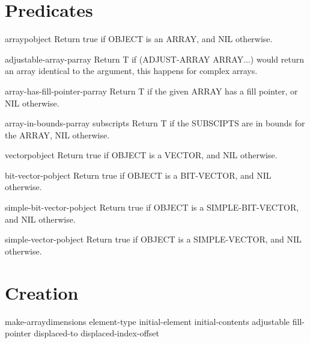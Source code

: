 \documentclass[10pt,english]{book}
\begin{document}
\section{Predicates}
\label{sec:array-predicates}

\begin{function}{arrayp}{object}
  Return true if OBJECT is an ARRAY, and NIL otherwise.
\end{function}

\begin{function}{adjustable-array-p}{array}
  Return T if (ADJUST-ARRAY ARRAY...) would return an array identical
   to the argument, this happens for complex arrays.
\end{function}

\begin{function}{array-has-fill-pointer-p}{array}
  Return T if the given ARRAY has a fill pointer, or NIL otherwise.
\end{function}

\begin{function}{array-in-bounds-p}{array \rest subscripts}
  Return T if the SUBSCIPTS are in bounds for the ARRAY, NIL otherwise.
\end{function}

\begin{function}{vectorp}{object}
  Return true if OBJECT is a VECTOR, and NIL otherwise.
\end{function}

\begin{function}{bit-vector-p}{object}
  Return true if OBJECT is a BIT-VECTOR, and NIL otherwise.
\end{function}

\begin{function}{simple-bit-vector-p}{object}
  Return true if OBJECT is a SIMPLE-BIT-VECTOR, and NIL otherwise.
\end{function}

\begin{function}{simple-vector-p}{object}
  Return true if OBJECT is a SIMPLE-VECTOR, and NIL otherwise.
\end{function}

\section{Creation}
\label{sec:array-creation}

\begin{function}{make-array}{dimensions \key element-type initial-element initial-contents adjustable
 fill-pointer displaced-to displaced-index-offset}
  
\end{function}
\end{document}
